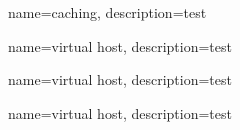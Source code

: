 {
	name={caching},
	description={test}
}

{
	name={virtual host},
	description={test}
}

{
	name={virtual host},
	description={test}
}

{
	name={virtual host},
	description={test}
}

